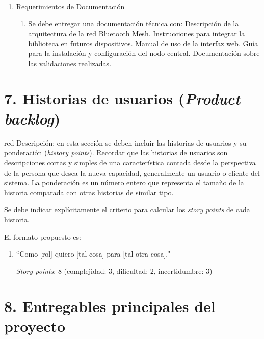 \documentclass[
11pt, %
]{charter}
\begin{document}
\begin{enumerate}
\item Requerimientos de Documentación
	\begin{enumerate}
		\item Se debe entregar una documentación técnica con:
			\subitem Descripción de la arquitectura de la red Bluetooth Mesh.
			\subitem Instrucciones para integrar la biblioteca en futuros dispositivos.
			\subitem Manual de uso de la interfaz web.
			\subitem Guía para la instalación y configuración del nodo central.
			\subitem Documentación sobre las validaciones realizadas.
	\end{enumerate}

\end{enumerate}


\section{7. Historias de usuarios (\textit{Product backlog})}
\label{sec:backlog}

\begin{consigna}{red}
Descripción: en esta sección se deben incluir las historias de usuarios y su ponderación (\textit{history points}). Recordar que las historias de usuarios son descripciones cortas y simples de una característica contada desde la perspectiva de la persona que desea la nueva capacidad, generalmente un usuario o cliente del sistema. La ponderación es un número entero que representa el tamaño de la historia comparada con otras historias de similar tipo.

Se debe indicar explícitamente el criterio para calcular los \textit{story points} de cada historia.

El formato propuesto es: 
\begin{enumerate}
\item ``Como [rol] quiero [tal cosa] para [tal otra cosa]."

\textit{Story points}: 8 (complejidad: 3, dificultad: 2, incertidumbre: 3)
\end{enumerate}
\end{consigna}

\section{8. Entregables principales del proyecto}
\label{sec:entregables}

\end{document}
